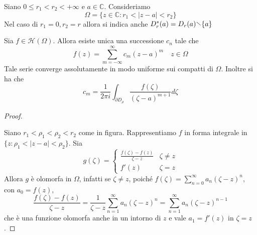Siano \(0 \le r_{1} < r_{2} < +\infty\) e \(a \in \mathbb{C}\). Consideriamo
\[
    \Omega = \{z \in \mathbb{C}: r_{1} < |z-a| < r_{2}\} 
\]
Nel caso di \(r_{1} = 0, r_{2}= r\) allora si indica anche \(D^{*}_r{(a)} =
D_r{(a)} \sminus \{a\} \) 
\begin{theorem}
    Sia \(f \in \mathcal{H}{(\Omega)}\). Allora esiste unica una successione
    \(c_{n}\) tale che 
    \[
        f{(z)} = \sum_{m=-\infty}^{\infty} c_{m} {(z-a)}^{m} \quad z \in \Omega
    \]
    Tale serie converge assolutamente in modo uniforme sui compatti di
    \(\Omega\).
    Inoltre si ha che
    \[
        c_m = \frac{1}{2\pi i} \int_{\partial D_\rho} \frac{f{(\zeta)}}{{(\zeta
        - a)}^{m+1}} d \zeta
    \]
\end{theorem}
\begin{proof}
\begin{figure}[ht]
    \centering
\end{figure}
    Siano \(r_{1} < \rho_{1} < \rho_{2} < r_{2}\) come in figura. Rappresentiamo \(f\) in forma
    integrale in \(\{z : \rho_{1} < |z-a| < \rho_{2}\} \). Sia 
    \[
        g{(\zeta)} = \begin{cases}
            \frac{f{(\zeta)} - f{(z)}}{\zeta - z} & \zeta \neq z \\
            f'{(z)} & \zeta = z
        \end{cases}
    \]
    Allora \(g\) è olomorfa in \(\Omega\), infatti se \(\zeta \neq z\), poiché
    \(\displaystyle f{(\zeta)} = \sum_{n=0}^{\infty} a_{n} {(\zeta - z)}^{n} \),
    con \(a_{0} = f{(z)}\),
    \[
        \frac{f{(\zeta)} - f{(z)}}{\zeta -z} = \frac{1}{\zeta-
        z}\sum_{n=1}^{\infty} a_{n} {(\zeta -z)}^{n} = \sum_{n=1}^{\infty}
        a_{n}{(\zeta - z)}^{n-1} 
    \]
    che è una funzione olomorfa anche in un intorno di \(z\) e vale
    \(a_{1} = f'{(z)}\) in \(\zeta = z\).


\end{proof}
